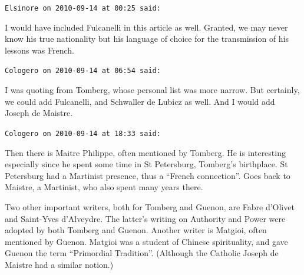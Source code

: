 \begin{footnotesize}
\begin{sffamily}
\texttt{Elsinore on 2010-09-14 at 00:25 said:}

I would have included Fulcanelli in this article as well. Granted, we may never know his true nationality but his language of choice for the transmission of his lessons was French.

\hfill

\texttt{Cologero on 2010-09-14 at 06:54 said:}

I was quoting from Tomberg, whose personal list was more narrow. But certainly, we could add Fulcanelli, and Schwaller de Lubicz as well. And I would add Joseph de Maistre.

\hfill

\texttt{Cologero on 2010-09-14 at 18:33 said:}

Then there is Maitre Philippe, often mentioned by Tomberg. He is interesting especially since he spent some time in St Petersburg, Tomberg's birthplace. St Petersburg had a Martinist presence, thus a ``French connection''. Goes back to Maistre, a Martinist, who also spent many years there.

Two other important writers, both for Tomberg and Guenon, are Fabre d'Olivet and Saint-Yves d'Alveydre. The latter's writing on Authority and Power were adopted by both Tomberg and Guenon. Another writer is Matgioi, often mentioned by Guenon. Matgioi was a student of Chinese spirituality, and gave Guenon the term ``Primordial Tradition''. (Although the Catholic Joseph de Maistre had a similar notion.)


\hfill

\end{sffamily}
\end{footnotesize}

